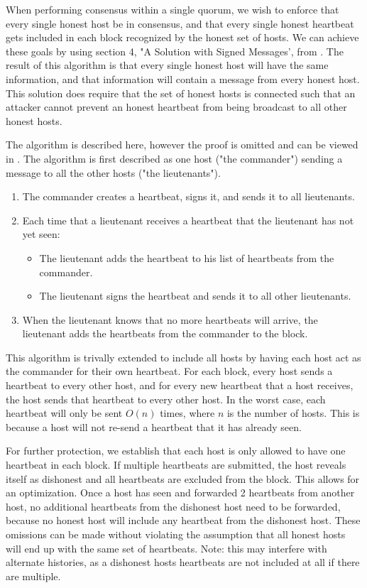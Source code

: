 \documentclass[twocolumn]{article}
\begin{document}
When performing consensus within a single quorum, we wish to enforce that every single honest host be in consensus, and that every single honest heartbeat gets included in each block recognized by the honest set of hosts.
We can achieve these goals by using section 4, "A Solution with Signed Messages', from \cite{bgp}.
The result of this algorithm is that every single honest host will have the same information, and that information will contain a message from every honest host.
This solution does require that the set of honest hosts is connected such that an attacker cannot prevent an honest heartbeat from being broadcast to all other honest hosts.

The algorithm is described here, however the proof is omitted and can be viewed in \cite{bgp}.
The algorithm is first described as one host ("the commander") sending a message to all the other hosts ("the lieutenants").
\begin{enumerate}
	\item The commander creates a heartbeat, signs it, and sends it to all lieutenants.
	\item Each time that a lieutenant receives a heartbeat that the lieutenant has not yet seen:
	\begin{itemize}
		\item The lieutenant adds the heartbeat to his list of heartbeats from the commander.
		\item The lieutenant signs the heartbeat and sends it to all other lieutenants.
	\end{itemize}
	\item When the lieutenant knows that no more heartbeats will arrive, the lieutenant adds the heartbeats from the commander to the block.
\end{enumerate}

This algorithm is trivally extended to include all hosts by having each host act as the commander for their own heartbeat.
For each block, every host sends a heartbeat to every other host, and for every new heartbeat that a host receives, the host sends that heartbeat to every other host.
In the worst case, each heartbeat will only be sent $O(n)$ times, where $n$ is the number of hosts.
This is because a host will not re-send a heartbeat that it has already seen.

For further protection, we establish that each host is only allowed to have one heartbeat in each block.
If multiple heartbeats are submitted, the host reveals itself as dishonest and all heartbeats are excluded from the block.
This allows for an optimization.
Once a host has seen and forwarded 2 heartbeats from another host, no additional heartbeats from the dishonest host need to be forwarded, because no honest host will include any heartbeat from the dishonest host.
These omissions can be made without violating the assumption that all honest hosts will end up with the same set of heartbeats.
Note: this may interfere with alternate histories, as a dishonest hosts heartbeats are not included at all if there are multiple.
\end{document}
